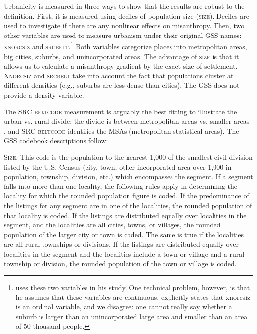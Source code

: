 \documentclass[11pt, letterpaper]{article}
\begin{document}
\begin{spacing}{1.4}
Urbanicity is measured in three ways to show that the
results are robust to the definition. First, it is measured using deciles of population size
(\textsc{size}). Deciles are used to investigate if there are any nonlinear
effects on misanthropy. Then, two other variables are used to measure urbanism under their original GSS names: \textsc{xnorcsiz} and \textsc{srcbelt}.\footnote{\citet{wilson85} uses these two variables in his study. One technical problem, however, is that he assumes that these variables are continuous. \citet{wilson85} explicitly states that xnorcsiz is an ordinal variable, and we disagree: one cannot really say whether a suburb is larger than an unincorporated large area and smaller than an area of 50 thousand people.} Both variables categorize places into metropolitan areas, big cities, suburbs, and  unincorporated areas. The advantage of \textsc{size} is that it allows us to calculate a misanthropy 
 gradient by the exact size of settlement. \textsc{Xnorcsiz} and \textsc{srcbelt} take into account the fact that populations cluster at different densities (e.g., suburbs are less dense than cities). The GSS does not provide a density variable. 

The \textsc{SRC beltcode} measurement is arguably the best fitting to illustrate the
urban vs. rural divide: the divide is between metropolitan areas vs. smaller areas
\citep{hansonCityJournalautumn15}, and \textsc{SRC beltcode} identifies the MSAs
(metropolitan statistical areas). The GSS codebook descriptions follow: 

\textsc{Size}. This code is the population to the nearest 1,000 of the smallest civil
division listed by the U.S. Census (city, town, other incorporated
area over 1,000 in population, township, division, etc.) which
encompasses the segment. If a segment falls into more than one
locality, the following rules apply in determining the locality for
which the rounded population figure is coded.
If the predominance of the listings for any segment are in one of the
localities, the rounded population of that locality is coded.
If the listings are distributed equally over localities in the
segment, and the localities are all cities, towns, or villages, the
rounded population of the larger city or town is coded. The same is
true if the localities are all rural townships or divisions.
If the listings are distributed equally over localities in the segment
and the localities include a town or village and a rural township or
division, the rounded population of the town or village is coded.


\end{spacing}
\end{document}
